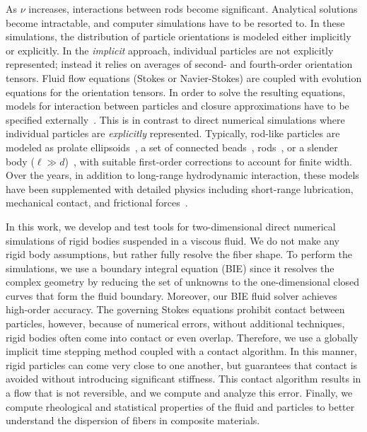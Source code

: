 \documentclass[AMA,STIX1COL]{WileyNJD-v2}
\begin{document}
As $\nu$ increases, interactions between rods become significant.
Analytical solutions become intractable, and computer simulations have
to be resorted to. In these simulations, the distribution of particle
orientations is modeled either implicitly or explicitly. In the
\emph{implicit} approach, individual particles are not explicitly
represented; instead it relies on averages of second- and fourth-order
orientation tensors. Fluid flow equations (Stokes or Navier-Stokes) are
coupled with evolution equations for the orientation tensors. In order
to solve the resulting equations, models for interaction between
particles and closure approximations have to be specified
externally~\cite{Advani1987, Advani1990, Ferec2014, Perez2017}. This is
in contrast to direct numerical simulations where individual particles
are \emph{explicitly} represented. Typically, rod-like particles are
modeled as prolate ellipsoids~\cite{Ausias2006}, a set of connected
beads~\cite{Yamamoto1996, Joung2001},
rods~\cite{Schmid2000,Lindstroem2007}, or a slender body ($\ell \gg
d$)~\cite{Fan1998, Rahnama1995, tor-she2004, tor-gus2006, gus-tor2009},
with suitable first-order corrections to account for finite width. Over
the years, in addition to long-range hydrodynamic interaction, these
models have been supplemented with detailed physics including
short-range lubrication, mechanical contact, and frictional
forces~\cite{Sundararajakumar1997, Lindstroem2008}.

In this work, we develop and test tools for two-dimensional direct
numerical simulations of rigid bodies suspended in a viscous fluid.  We
do not make any rigid body assumptions, but rather fully resolve the
fiber shape.  To perform the simulations, we use a boundary integral
equation (BIE) since it resolves the complex geometry by reducing the
set of unknowns to the one-dimensional closed curves that form the fluid
boundary.  Moreover, our BIE fluid solver achieves high-order accuracy.
The governing Stokes equations prohibit contact between particles,
however, because of numerical errors, without additional techniques,
rigid bodies often come into contact or even overlap.  Therefore, we use
a globally implicit time stepping method coupled with a contact
algorithm.  In this manner, rigid particles can come very close to one
another, but guarantees that contact is avoided without introducing
significant stiffness.  This contact algorithm results in a flow that is
not reversible, and we compute and analyze this error.  Finally, we
compute rheological and statistical properties of the fluid and
particles to better understand the dispersion of fibers in composite
materials.
\end{document}
